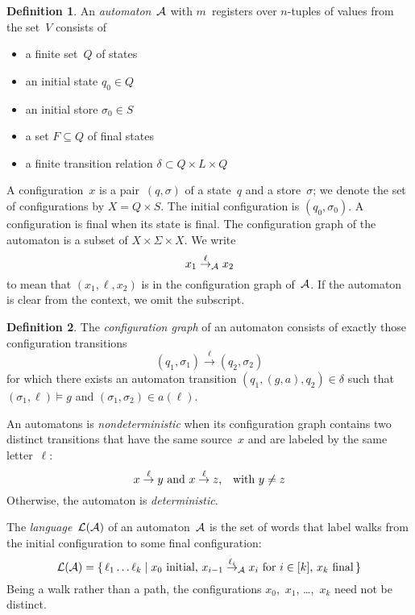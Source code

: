 \documentclass[9pt, preprint]{sigplanconf} %
\theoremstyle{definition}
\newtheorem{definition}{Definition}
\theoremstyle{remark}
\begin{document}
\begin{definition}\label{def:automaton}
An \emph{automaton}~${\cal A}$ with $m$~registers over $n$-tuples of values from the set~$V$ consists of
\begin{itemize}
\item a finite set~$Q$ of states
\item an initial state $q_0\in Q$
\item an initial store $\sigma_0\in S$
\item a set $F\subseteq Q$ of final states
\item a finite transition relation $\delta\subset Q\times L\times Q$
\end{itemize}
\end{definition}

A configuration~$x$ is a pair~$(q,\sigma)$ of a state~$q$ and a store~$\sigma$;
we denote the set of configurations by $X=Q\times S$.
The initial configuration is $(q_0,\sigma_0)$.
A configuration is final when its state is final.
The configuration graph of the automaton is a subset of $X\times\Sigma\times X$.
We write \[x_1\stackrel{\ell}{\to}_{\cal A}x_2\] to mean that $(x_1,\ell,x_2)$ is in the configuration graph of~${\cal A}$.
If the automaton is clear from the context, we omit the subscript.

\begin{definition}\label{def:cgraph}
The \emph{configuration graph} of an automaton consists of exactly those configuration transitions \[ (q_1,\sigma_1) \stackrel{\ell}{\to} (q_2,\sigma_2) \] for which there exists an automaton transition $(q_1,(g,a),q_2)\in\delta$ such that $(\sigma_1,\ell)\models g$ and $(\sigma_1,\sigma_2)\in a(\ell)$.
\end{definition}
An automatons is \emph{nondeterministic} when its configuration graph contains two distinct transitions that have the same source~$x$ and are labeled by the same letter~$\ell$:
\[ \text{$x\stackrel\ell\to y$ and $x\stackrel\ell\to z$,\quad with $y\ne z$} \]
Otherwise, the automaton is \emph{deterministic}.

The \emph{language}~${\cal L}({\cal A})$ of an automaton~${\cal A}$ is the set of words that label walks from the initial configuration to some final configuration:
\[ {\cal L}({\cal A}) =
  \{\,\ell_1\ldots\ell_k\mid \text{$x_0$ initial,
  $x_{i-1}\stackrel{\ell_i}\to_{\cal A} x_i$ for $i\in[k]$,
  $x_k$ final}\,\}\]
Being a walk rather than a path, the configurations $x_0$,~$x_1$, \dots,~$x_k$ need not be distinct.
\end{document}
